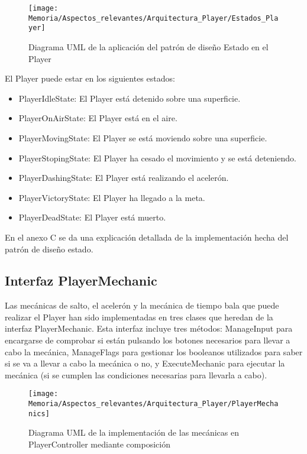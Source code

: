 \begin{figure}[h]
\centering
\texttt{[image: Memoria/Aspectos\_relevantes/Arquitectura\_Player/Estados\_Player]}
\caption{Diagrama UML de la aplicación del patrón de diseño Estado en el Player}
\end{figure}

El Player puede estar en los siguientes estados:
\begin{itemize}
\item
PlayerIdleState: El Player está detenido sobre una superficie.
\item
PlayerOnAirState: El Player está en el aire.
\item
PlayerMovingState: El Player se está moviendo sobre una superficie.
\item
PlayerStopingState: El Player ha cesado el movimiento y se está deteniendo.
\item
PlayerDashingState: El Player está realizando el acelerón.
\item
PlayerVictoryState: El Player ha llegado a la meta.
\item
PlayerDeadState: El Player está muerto.
\end{itemize}

En el anexo C se da una explicación detallada de la implementación hecha del patrón de diseño estado.

\subsection{Interfaz PlayerMechanic}
Las mecánicas de salto, el acelerón y la mecánica de tiempo bala que puede realizar el Player han sido implementadas en tres clases que heredan de la interfaz PlayerMechanic. Esta interfaz incluye tres métodos: ManageInput para encargarse de comprobar si están pulsando los botones necesarios para llevar a cabo la mecánica, ManageFlags para gestionar los booleanos utilizados para saber si se va a llevar a cabo la mecánica o no, y ExecuteMechanic para ejecutar la mecánica (si se cumplen las condiciones necesarias para llevarla a cabo).

\begin{figure}[h]
\centering
\texttt{[image: Memoria/Aspectos\_relevantes/Arquitectura\_Player/PlayerMechanics]}
\caption{Diagrama UML de la implementación de las mecánicas en PlayerController mediante composición}
\end{figure}

